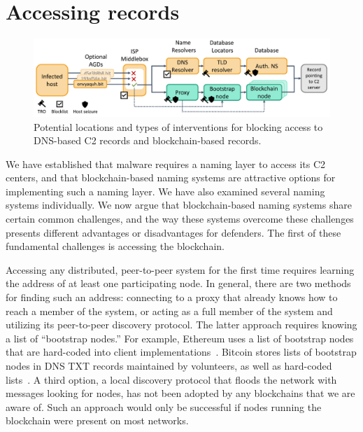 \section{Accessing records}
\label{sec:accessing_records}

\begin{figure}[t]
	\centering
	\includegraphics[width=\textwidth]{figs/intervention_locations.pdf}
	\caption{Potential locations and types of interventions for blocking access 
		to 	DNS-based C2 records and blockchain-based records.}
	\label{fig:malware_contacting_cnc}
\end{figure}

We have established that malware requires a naming layer to access its C2 
centers, and 
that blockchain-based naming systems are attractive options for implementing 
such a naming layer. We have also examined several naming systems individually. 
We now argue that blockchain-based naming systems share certain common 
challenges, and the way these systems overcome these challenges presents 
different advantages or disadvantages for defenders. The first 
of these fundamental challenges is accessing the blockchain.

Accessing any distributed, peer-to-peer system for the first time requires 
learning the address of at least one participating node. In general, there 
are two methods for finding such an address: connecting to a 
proxy that already knows how to reach a member of the system, or acting 
as a full member of the system and utilizing its peer-to-peer discovery 
protocol. The latter approach requires knowing a list of ``bootstrap nodes.'' 
For example, Ethereum uses a list of bootstrap nodes that are hard-coded into 
client implementations~\cite{geth_bootstrap}. Bitcoin 
stores lists of bootstrap nodes in DNS TXT records maintained by volunteers, as 
well as hard-coded 
lists~\cite{bitcoin_bootstrap}. A third option, a 
local discovery protocol that floods the network with 
messages looking for nodes, has not been adopted by any 
blockchains that we are aware of. Such an approach would only be successful if 
nodes running the blockchain were present on most networks. 
 
